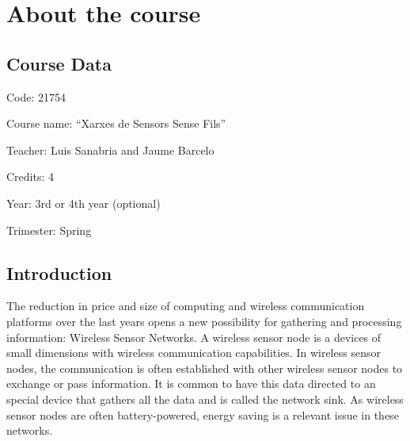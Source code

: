 \chapter{About the course}

\section{Course Data}

Code: 21754

Course name: ``Xarxes de Sensors Sense Fils''

Teacher: Luis Sanabria and Jaume Barcelo

Credits: 4

Year: 3rd or 4th year (optional)

Trimester: Spring

\section{Introduction}
The reduction in price and size of computing and wireless communication platforms over the last years opens a new possibility for gathering and processing information: Wireless Sensor Networks.
A wireless sensor node is a devices of small dimensions with wireless communication capabilities.
In wireless sensor nodes, the communication is often established with other wireless sensor nodes to exchange or pass information.
It is common to have this data directed to an special device that gathers all the data and is called the network sink.
As wireless sensor nodes are often battery-powered, energy saving is a relevant issue in these networks.

